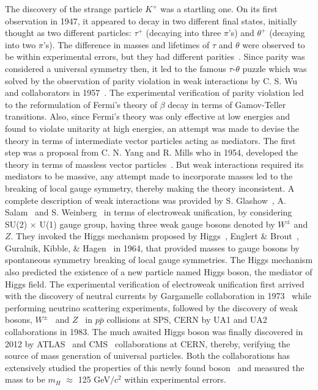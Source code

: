 The discovery of the strange particle $K^{+}$ was a startling one. On its first observation in 1947, it appeared to decay in two different
final states, initially thought as two different particles: $\tau^{+}$ (decaying into three $\pi$'s) and $\theta^{+}$ (decaying into two $\pi$'s).
The difference in masses and lifetimes of $\tau$ and $\theta$ were observed to be within experimental errors, but they had different parities~\cite{Lee:1956qn}.
Since parity was considered a universal symmetry then, it led to the famous $\tau$-$\theta$ puzzle
which was solved by the observation of parity violation in weak interactions
by C. S. Wu and collaborators in 1957~\cite{Wu:1957my}. The experimental verification of parity violation led 
to the reformulation of Fermi's theory of $\beta$ decay in terms of
Gamov-Teller transitions. Also, since Fermi's theory was only effective at low energies and found to violate unitarity at high energies, an attempt was
made to devise the theory in terms of intermediate vector particles acting as mediators. The first step was a proposal from C. N. Yang and R. Mills
who in 1954, developed the theory in terms of massless vector particles~\cite{Yang:1954ek}.
But weak interactions required its mediators to be massive, any attempt made to incorporate
masses led to the breaking of local gauge symmetry, thereby making the theory inconsistent. A complete description of weak
interactions was provided by S. Glashow~\cite{Glashow:1961tr}, A. Salam~\cite{Salam:1964ry} and S. Weinberg~\cite{Weinberg:1967tq} 
in terms of electroweak unification, by considering SU(2) $\times$ U(1) gauge group, having three weak gauge bosons denoted by $W^{\pm}$ and $Z$.
They invoked the Higgs mechanism proposed by Higgs~\cite{Higgs:1964ia, Higgs:1964pj, Higgs:1966ev}, Englert $\&$ Brout~\cite{Englert:1964et},
Guralnik, Kibble, $\&$ Hagen~\cite{Guralnik:1964eu} in 1964, that provided masses to gauge bosons by
spontaneous symmetry breaking of local gauge symmetries. The Higgs mechanism also predicted the existence of a new particle named Higgs boson, the mediator of Higgs field. 
The experimental verification of electroweak unification first arrived with the discovery of neutral currents by Gargamelle collaboration in 1973~\cite{Hasert:1973ff}
while performing neutrino scattering experiments, followed by the discovery of weak bosons, $W^{\pm}$~\cite{Arnison:1983rp, Banner:1983jy}
and $Z$~\cite{Arnison:1983mk, Arnison:1983zy, Bagnaia:1983zx} in $p\bar{p}$ collisions at SPS, CERN by UA1 and UA2
collaborations in 1983. The much awaited Higgs boson was finally discovered in 2012 by ATLAS~\cite{Aad:2012tfa} and CMS~\cite{Chatrchyan:2012xdj}
collaborations at CERN, thereby, verifying the source
of mass generation of universal particles. Both the collaborations has extensively studied the properties of this newly
found boson~\cite{CMS:yva, ATLAS:2014yka} and measured the mass to be $m_{H}$ $\approx$ 125 GeV$/$c$^{2}$ within experimental errors.


